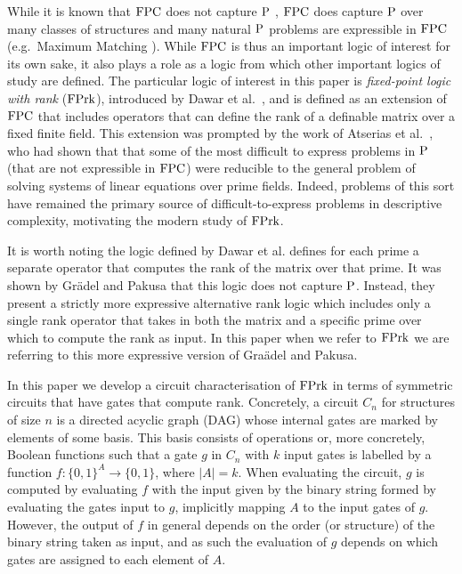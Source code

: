 \documentclass[../paper.tex]{subfiles}
\begin{document}
While it is known that $\text{\upshape FPC}$ does not capture $\mathrm{P}$ \cite{Cau1992}, $\text{\upshape FPC}$ does
capture $\mathrm{P}$ over many classes of structures \cite{Grohe2010} and many natural
$\mathrm{P}$ problems are expressible in $\text{\upshape FPC}$ (e.g.\ Maximum Matching
\cite{Anderson2013}). While $\text{\upshape FPC}$ is thus an important logic of interest for
its own sake, it also plays a role as a logic from which other important logics
of study are defined. The particular logic of interest in this paper is
\emph{fixed-point logic with rank} ($\text{\upshape FPrk}$), introduced by Dawar et
al.~\cite{Dawar09logicswith}, and is defined as an extension of $\text{\upshape FPC}$ that
includes operators that can define the rank of a definable matrix over a fixed
finite field. This extension was prompted by the work of Atserias et
al.~\cite{Atserias20091666}, who had shown that that some of the most difficult
to express problems in $\mathrm{P}$ (that are not expressible in $\text{\upshape FPC}$) were reducible
to the general problem of solving systems of linear equations over prime fields.
Indeed, problems of this sort have remained the primary source of
difficult-to-express problems in descriptive complexity, motivating the modern
study of $\text{\upshape FPrk}$.

It is worth noting the logic defined by Dawar et al.\cite{} defines for each
prime a separate operator that computes the rank of the matrix over that prime.
It was shown by Gr\"{a}del and Pakusa \cite{GradelP15a} that this logic does not
capture $\mathrm{P}$. Instead, they present a strictly more expressive alternative rank
logic which includes only a single rank operator that takes in both the matrix
and a specific prime over which to compute the rank as input. In this paper when
we refer to $\text{\upshape FPrk}$ we are referring to this more expressive version of
Gra\"{a}del and Pakusa.

In this paper we develop a circuit characterisation of $\text{\upshape FPrk}$ in terms of
symmetric circuits that have gates that compute rank. Concretely, a circuit
$C_n$ for structures of size $n$ is a directed acyclic graph (DAG) whose
internal gates are marked by elements of some basis. This basis consists of
operations or, more concretely, Boolean functions such that a gate $g$ in $C_n$
with $k$ input gates is labelled by a function $f: \{0,1\}^A \rightarrow
\{0,1\}$, where $\vert A \vert = k$. When evaluating the circuit, $g$ is
computed by evaluating $f$ with the input given by the binary string formed by
evaluating the gates input to $g$, implicitly mapping $A$ to the input gates of
$g$. However, the output of $f$ in general depends on the order (or structure)
of the binary string taken as input, and as such the evaluation of $g$ depends
on which gates are assigned to each element of $A$.
\end{document}
